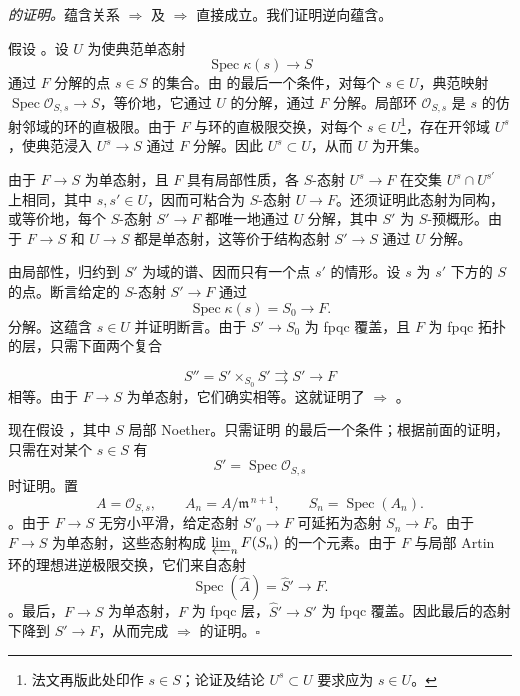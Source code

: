 \medskip\noindent\textit{ 的证明。}蕴含关系  \(\Rightarrow\)  及  \(\Rightarrow\)  直接成立。我们证明逆向蕴含。

假设 。设 \(U\) 为使典范单态射 \[
  \operatorname{Spec}\kappa(s)\longrightarrow S
\] 通过 \(F\) 分解的点 \(s\in S\) 的集合。由  的最后一个条件，对每个 \(s\in U\)，典范映射 \(\operatorname{Spec}\mathscr O_{S,s}\to S\)，等价地，它通过 \(U\) 的分解，通过 \(F\) 分解。局部环 \(\mathscr O_{S,s}\) 是 \(s\) 的仿射邻域的环的直极限。由于 \(F\) 与环的直极限交换，对每个 \(s\in U\)\footnote{法文再版此处印作 \(s\in S\)；论证及结论 \(U^s\subset U\) 要求应为 \(s\in U\)。}，存在开邻域 \(U^s\)，使典范浸入 \(U^s\to S\) 通过 \(F\) 分解。因此 \(U^s\subset U\)，从而 \(U\) 为开集。

由于 \(F\to S\) 为单态射，且 \(F\) 具有局部性质，各 \(S\)-态射 \(U^s\to F\) 在交集 \(U^s\cap U^{s'}\) 上相同，其中 \(s,s'\in U\)，因而可粘合为 \(S\)-态射 \(U\to F\)。还须证明此态射为同构，或等价地，每个 \(S\)-态射 \(S'\to F\) 都唯一地通过 \(U\) 分解，其中 \(S'\) 为 \(S\)-预概形。由于 \(F\to S\) 和 \(U\to S\) 都是单态射，这等价于结构态射 \(S'\to S\) 通过 \(U\) 分解。

由局部性，归约到 \(S'\) 为域的谱、因而只有一个点 \(s'\) 的情形。设 \(s\) 为 \(s'\) 下方的 \(S\) 的点。断言给定的 \(S\)-态射 \(S'\to F\) 通过 \[
  \operatorname{Spec}\kappa(s)=S_0\longrightarrow F.
\] 分解。这蕴含 \(s\in U\) 并证明断言。由于 \(S'\to S_0\) 为 fpqc 覆盖，且 \(F\) 为 fpqc 拓扑的层，只需下面两个复合

 \[
  S''=S'\times_{S_0}S'
  \rightrightarrows S'\longrightarrow F
\] 相等。由于 \(F\to S\) 为单态射，它们确实相等。这就证明了  \(\Rightarrow\) 。

现在假设 ，其中 \(S\) 局部 Noether。只需证明  的最后一个条件；根据前面的证明，只需在对某个 \(s\in S\) 有 \[
  S'=\operatorname{Spec}\mathscr O_{S,s}
\] 时证明。置 \[
  A=\mathscr O_{S,s},
  \qquad
  A_n=A/\mathfrak m^{\,n+1},
  \qquad
  S_n=\operatorname{Spec}(A_n).
\]。由于 \(F\to S\) 无穷小平滑，给定态射 \(S'_0\to F\) 可延拓为态射 \(S_n\to F\)。由于 \(F\to S\) 为单态射，这些态射构成 \(\varprojlim_n F(S_n)\) 的一个元素。由于 \(F\) 与局部 Artin 环的理想进逆极限交换，它们来自态射 \[
  \operatorname{Spec}(\widehat A)=\widehat S'\longrightarrow F.
\]。最后，\(F\to S\) 为单态射，\(F\) 为 fpqc 层，\(\widehat S'\to S'\) 为 fpqc 覆盖。因此最后的态射下降到 \(S'\to F\)，从而完成  \(\Rightarrow\)  的证明。\hfill\(\square\)

